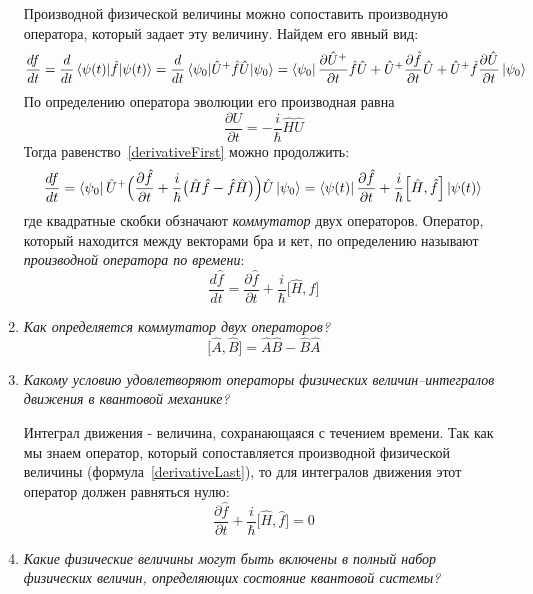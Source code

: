 \documentclass{article}
\begin{document}
\begin{enumerate}
	Производной физической величины можно сопоставить производную оператора, который задает эту величину. Найдем его явный вид:
	\begin{equation}
		\frac{df}{dt} = \frac{d}{dt} \braket{\psi(t) | \hat{f} | \psi(t)} = \frac{d}{dt} \braket{\psi_0 |\hat{U}^+ \hat{f} \hat{U} | \psi_0} = \bra{\psi_0} \frac{\partial \hat{U}^+}{\partial t} \hat{f} \hat{U} + \hat{U}^+\frac{\partial \hat{f}}{\partial t} \hat{U} + \hat{U}^+ \hat{f}\frac{\partial \hat{U}}{\partial t} \ket{\psi_0} \label{derivativeFirst}
	\end{equation}
	По определению оператора эволюции его производная равна
	\begin{equation}
		\frac{\partial U}{\partial t} = -\frac{i}{\hbar} \hat{H} \hat{U}
	\end{equation}
	Тогда равенство~\eqref{derivativeFirst} можно продолжить:
	\begin{equation}
		\frac{df}{dt} = \bra{\psi_0} \hat{U}^+ \Big( \frac{\partial \hat{f}}{\partial t} + \frac{i}{\hbar} \big( \hat{H} \hat{f} - \hat{f} \hat{H} \big) \Big)\hat{U}\ket{\psi_0} = \bra{\psi(t)}\frac{\partial \hat{f}}{\partial t} + \frac{i}{\hbar} \Big[ \hat{H}, \hat{f}\Big] \ket{\psi(t)}
	\end{equation}
	где квадратные скобки обзначают \textit{коммутатор} двух операторов. Оператор, который находится между векторами бра и кет, по определению называют \textit{производной оператора по времени}:
	\begin{equation}
	\frac{d\hat{f}}{dt} = \frac{\partial \hat{f}}{\partial t} + \frac{i}{\hbar} \Big[ \hat{H}, \hat{f}\Big] \label{derivativeLast}
	\end{equation}
	\item \textit{
	Как определяется коммутатор двух операторов?	
	}
	\begin{equation}
		\Big[ \hat{A}, \hat{B} \Big] = \hat{A} \hat{B} - \hat{B} \hat{A}
	\end{equation}
	\item \textit{
 Какому условию удовлетворяют операторы физических величин–интегралов движения в квантовой механике?	
	}
	
	Интеграл движения - величина, сохранающаяся с течением времени. Так как мы знаем оператор, который сопоставляется производной физической величины (формула~\eqref{derivativeLast}), то для интегралов движения этот оператор должен равняться нулю:
	\begin{equation}
		\frac{\partial \hat{f}}{\partial t} + \frac{i}{\hbar} \Big[ \hat{H}, \hat{f}\Big] = 0
	\end{equation}
	\item \textit{
	Какие физические величины могут быть включены в полный набор физических величин, определяющих состояние квантовой системы?	
	}
	

\end{enumerate}
\end{document}
